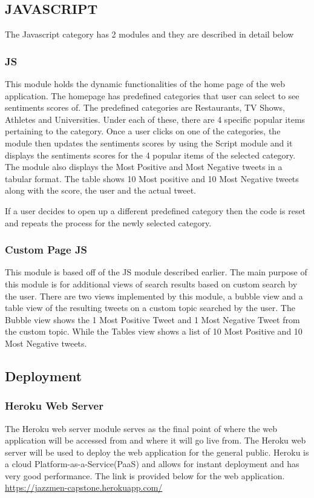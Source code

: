 \documentclass[12pt, titlepage]{article}
\begin{document}
\subsection{JAVASCRIPT}
The Javascript category has 2 modules and they are described in detail below

\subsubsection{JS}
This module holds the dynamic functionalities of the home page of the web application. The homepage has predefined categories that user can select to see sentiments scores of. The predefined categories are Restaurants, TV Shows, Athletes and Universities. Under each of these, there are 4 specific popular items pertaining to the category. 
Once a user clicks on one of the categories, the module then updates the sentiments scores by using the Script module and it displays the sentiments scores for the 4 popular items of the selected category. The module also displays the Most Positive and Most Negative tweets in a tabular format. The table shows 10 Most positive and 10 Most Negative tweets along with the score, the user and the actual tweet.

If a user decides to open up a different predefined category then the code is reset and repeats the process for the newly selected category. 

\subsubsection{Custom Page JS}

This module is based off of the JS module described earlier. The main purpose of this module is for additional views of search results based on custom search by the user. There are two views implemented by this module, a bubble view and a table view of the resulting tweets on a custom topic searched by the user. The Bubble view shows the 1 Most Positive Tweet and 1 Most Negative Tweet from the custom topic. While the Tables view shows a list of 10 Most Positive and 10 Most Negative tweets. 

\subsection{Deployment}
\subsubsection{Heroku Web Server}
The Heroku web server module serves as the final point of where the web application will be accessed from and where it will go live from. The Heroku web server will be used to deploy the web application for the general public. Heroku is a cloud Platform-as-a-Service(PaaS) and allows for instant deployment and has very good performance. The link is provided below for the web application. \\
\url{https://jazzmen-capstone.herokuapp.com/}
\end{document}
